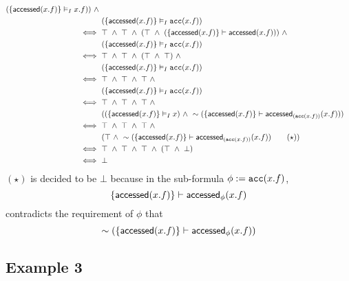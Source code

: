 \begin{align*}
  (\left\{  \textsf{accessed}(x.f)  \right\} \vDash_I x.f)) \ \land \\ & \
(\left\{  \textsf{accessed}(x.f)  \right\} \vDash_I \texttt{acc}(x.f))
\\ \iff & \
\top \ \land \ \top \ \land \
(\top \ \land \
  (\left\{  \textsf{accessed}(x.f)  \right\} \vdash \textsf{accessed}(x.f))) \ \land \\ & \
(\left\{  \textsf{accessed}(x.f)  \right\} \vDash_I \texttt{acc}(x.f))
\\ \iff & \
\top \ \land \ \top \ \land \
(\top \ \land \ \top) \ \land \\ & \
(\left\{  \textsf{accessed}(x.f)  \right\} \vDash_I \texttt{acc}(x.f))
\\ \iff & \
\top \ \land \ \top \ \land \ \top \ \land \\ & \
(\left\{  \textsf{accessed}(x.f)  \right\} \vDash_I \texttt{acc}(x.f))
\\ \iff & \
\top \ \land \ \top \ \land \ \top \ \land \\ & \
(
  (\left\{  \textsf{accessed}(x.f)  \right\} \vDash_I x) \ \land \
  \sim (\left\{  \textsf{accessed}(x.f)  \right\} \vdash \textsf{accessed}_{(\texttt{acc}(x.f))}(x.f))
)
\\ \iff & \
\top \ \land \ \top \ \land \ \top \ \land \\ & \
(
  \top \ \land \
  \sim (\left\{  \textsf{accessed}(x.f)  \right\} \vdash \textsf{accessed}_{(\texttt{acc}(x.f))}(x.f)) \tag{$\star$}
)
\\ \iff & \
\top \ \land \ \top \ \land \ \top \ \land \
(
  \top \ \land \
  \bot
)
\\ \iff & \
\bot
\end{align*}
$(\star)$ is decided to be $\bot$ because in the sub-formula $\phi := \texttt{acc}(x.f)$,
$$
  \left\{  \textsf{accessed}(x.f)  \right\} \vdash \textsf{accessed}_{\phi}(x.f)
$$
contradicts the requirement of $\phi$ that
$$
  \sim (\left\{  \textsf{accessed}(x.f)  \right\} \vdash \textsf{accessed}_{\phi}(x.f))
$$

\newpage
\subsection*{Example 3}



